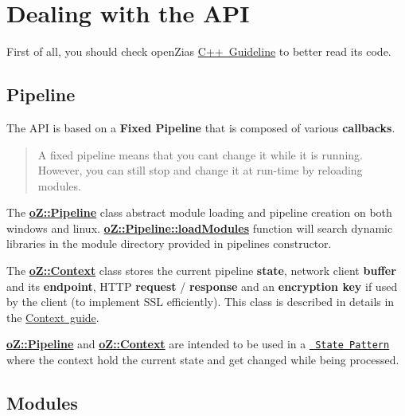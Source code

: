 \section*{Dealing with the A\+PI}

First of all, you should check open\+Zia\textquotesingle{}s \mbox{\hyperlink{md__g_u_i_d_e_l_i_n_e}{C++ Guideline}} to better read its code.

\subsection*{Pipeline}

The A\+PI is based on a {\bfseries{Fixed Pipeline}} that is composed of various {\bfseries{callbacks}}.

\begin{quote}
A fixed pipeline means that you can\textquotesingle{}t change it while it is running. However, you can still stop and change it at run-\/time by reloading modules. \end{quote}


The {\bfseries{\mbox{\hyperlink{classo_z_1_1_pipeline}{o\+Z\+::\+Pipeline}}}} class abstract module loading and pipeline creation on both windows and linux. {\bfseries{\mbox{\hyperlink{classo_z_1_1_pipeline_a2815743412c13100c68fee0d87283417}{o\+Z\+::\+Pipeline\+::load\+Modules}}}} function will search dynamic libraries in the module directory provided in pipeline\textquotesingle{}s constructor.

The {\bfseries{\mbox{\hyperlink{classo_z_1_1_context}{o\+Z\+::\+Context}}}} class stores the current pipeline {\bfseries{state}}, network client {\bfseries{buffer}} and its {\bfseries{endpoint}}, H\+T\+TP {\bfseries{request}} / {\bfseries{response}} and an {\bfseries{encryption key}} if used by the client (to implement S\+SL efficiently). This class is described in details in the \mbox{\hyperlink{md__c_o_n_t_e_x_t}{Context guide}}.

{\bfseries{\mbox{\hyperlink{classo_z_1_1_pipeline}{o\+Z\+::\+Pipeline}}}} and {\bfseries{\mbox{\hyperlink{classo_z_1_1_context}{o\+Z\+::\+Context}}}} are intended to be used in a \href{https://en.wikipedia.org/wiki/State_pattern}{\texttt{ State Pattern}} where the context hold the current state and get changed while being processed.

\subsection*{Modules}

